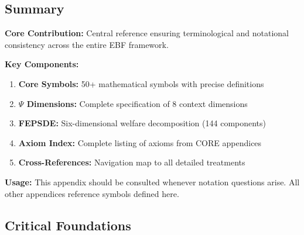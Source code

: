 \subsection{Summary}

\begin{tcolorbox}[colback=blue!5!white, colframe=blue!75!black,
    title=\textbf{Appendix UNMAPPED_GLS Summary: REF-GLOSSARY}]

\textbf{Core Contribution:}
Central reference ensuring terminological and notational consistency across
the entire EBF framework.

\textbf{Key Components:}
\begin{enumerate}[nosep]
    \item \textbf{Core Symbols:} 50+ mathematical symbols with precise definitions
    \item \textbf{$\Psi$ Dimensions:} Complete specification of 8 context dimensions
    \item \textbf{FEPSDE:} Six-dimensional welfare decomposition (144 components)
    \item \textbf{Axiom Index:} Complete listing of axioms from CORE appendices
    \item \textbf{Cross-References:} Navigation map to all detailed treatments
\end{enumerate}

\textbf{Usage:}
This appendix should be consulted whenever notation questions arise.
All other appendices reference symbols defined here.

\end{tcolorbox}


\subsection{Critical Foundations}
\label{sec:glossary-foundations}

